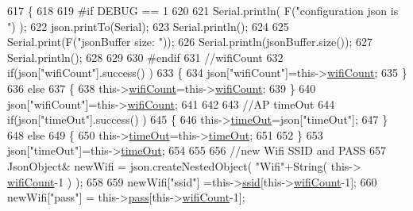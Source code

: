 \begin{DoxyCode}
617         \{
618         
619 \textcolor{preprocessor}{        #if DEBUG == 1 }
620         
621             Serial.println( F(\textcolor{stringliteral}{"configuration json is "}) );
622             json.printTo(Serial);
623             Serial.println();
624 
625             Serial.print(F(\textcolor{stringliteral}{"jsonBuffer size: "}));
626             Serial.println(jsonBuffer.size());
627             Serial.println();
628 
629 
630 \textcolor{preprocessor}{        #endif}
631             \textcolor{comment}{//wifiCount}
632             \textcolor{keywordflow}{if}(json[\textcolor{stringliteral}{"wifiCount"}].success() )
633             \{           
634                 json[\textcolor{stringliteral}{"wifiCount"}]=this->\hyperlink{classCoolWifi_ab133bd92fcb895b884deecd6678592e4}{wifiCount};
635             \}
636             \textcolor{keywordflow}{else}
637             \{
638                 this->\hyperlink{classCoolWifi_ab133bd92fcb895b884deecd6678592e4}{wifiCount}=this->\hyperlink{classCoolWifi_ab133bd92fcb895b884deecd6678592e4}{wifiCount};
639             \}
640             json[\textcolor{stringliteral}{"wifiCount"}]=this->\hyperlink{classCoolWifi_ab133bd92fcb895b884deecd6678592e4}{wifiCount};
641 
642             
643             \textcolor{comment}{//AP timeOut}
644             \textcolor{keywordflow}{if}(json[\textcolor{stringliteral}{"timeOut"}].success() )
645             \{
646                 this->\hyperlink{classCoolWifi_a952111605f25156588b5632caaba1c6f}{timeOut}=json[\textcolor{stringliteral}{"timeOut"}];
647             \}
648             \textcolor{keywordflow}{else}
649             \{
650                 this->\hyperlink{classCoolWifi_a952111605f25156588b5632caaba1c6f}{timeOut}=this->\hyperlink{classCoolWifi_a952111605f25156588b5632caaba1c6f}{timeOut};
651 
652             \}
653             json[\textcolor{stringliteral}{"timeOut"}]=this->\hyperlink{classCoolWifi_a952111605f25156588b5632caaba1c6f}{timeOut};
654             
655             
656             \textcolor{comment}{//new Wifi SSID and PASS}
657             JsonObject& newWifi = json.createNestedObject( \textcolor{stringliteral}{"Wifi"}+String( this->
      \hyperlink{classCoolWifi_ab133bd92fcb895b884deecd6678592e4}{wifiCount}-1 ) );
658             
659             newWifi[\textcolor{stringliteral}{"ssid"}] =this->\hyperlink{classCoolWifi_a893b21d0fed821438733bba2e73fb4c2}{ssid}[this->\hyperlink{classCoolWifi_ab133bd92fcb895b884deecd6678592e4}{wifiCount}-1];
660             newWifi[\textcolor{stringliteral}{"pass"}] = this->\hyperlink{classCoolWifi_a0c3332a149245aaad060b32593a54c9b}{pass}[this->\hyperlink{classCoolWifi_ab133bd92fcb895b884deecd6678592e4}{wifiCount}-1];

\end{DoxyCode}
